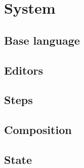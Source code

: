 
\section{System}

\subsection{Base language}
\subsection{Editors}
\subsection{Steps}
\subsection{Composition}
\subsection{State}
